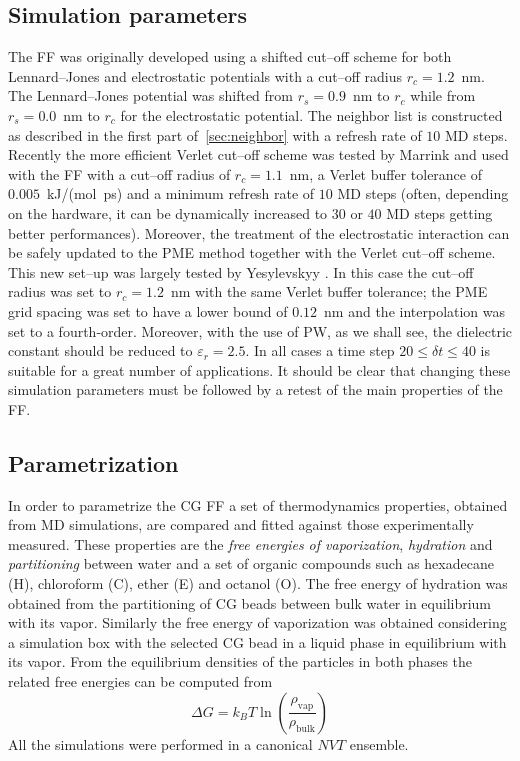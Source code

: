 \subsection{Simulation parameters}
The \martini \ac{FF} was originally developed using a shifted cut--off scheme for both Lennard--Jones and
electrostatic potentials with a cut--off radius $r_c = 1.2$~nm. The Lennard--Jones potential was shifted from
$r_s = 0.9$~nm to $r_c$ while from $r_s = 0.0$~nm to $r_c$ for the electrostatic potential. The neighbor list is
constructed as described in the first part of~\ref{sec:neighbor} with a refresh rate of $10$ \ac{MD} steps.
Recently the more efficient Verlet cut--off scheme was tested by Marrink \etal \cite{MartiniReview} and used
with the \martini \ac{FF} with a cut--off radius of $r_c = 1.1$~nm, a Verlet buffer tolerance of $0.005$~kJ/(mol\
ps) and a minimum refresh rate of $10$ \ac{MD} steps (often, depending on the hardware, it can be dynamically
increased to $30$ or $40$ \ac{MD} steps getting better performances).  Moreover, the treatment of the
electrostatic interaction can be safely updated to the \ac{PME} method together with the Verlet cut--off scheme.
This new set--up was largely tested by Yesylevskyy \etal \cite{PW}. In this case the cut--off radius was set to
$r_c = 1.2$~nm with the same Verlet buffer tolerance; the \ac{PME} grid spacing was set to have a lower bound of
$0.12$~nm and the interpolation was set to a fourth-order. Moreover, with the use of \ac{PW}, as we shall see,
the dielectric constant should be reduced to $\varepsilon_r = 2.5$. In all cases a time step
$20\le\delta t\le 40$ is suitable for a great number of applications. It should be clear that changing these
simulation parameters must be followed by a retest of the main properties of the \martini \ac{FF}.

\subsection{Parametrization}
\label{sec:martiniParam}
In order to parametrize the \martini \ac{CG} \ac{FF} a set of thermodynamics properties, obtained from \ac{MD}
simulations, are compared and fitted against those experimentally measured. These properties are the \textit{free
energies of vaporization}, \textit{hydration} and \textit{partitioning} between water and a set of organic
compounds such as hexadecane (H), chloroform (C), ether (E) and octanol (O). The free energy of hydration was
obtained from the partitioning of \ac{CG} beads between bulk water in equilibrium with its vapor. Similarly the
free energy of vaporization was obtained considering a simulation box with the selected \ac{CG} bead in a liquid
phase in equilibrium with its vapor. From the equilibrium densities of the particles in both phases the related
free energies can be computed from
\begin{equation*}
	\Delta G = k_B T\ln \left ( \frac{\rho_{\text{vap}}}{\rho_{\text{bulk}}} \right )
\end{equation*}
All the simulations were performed in a canonical $NVT$ ensemble.

